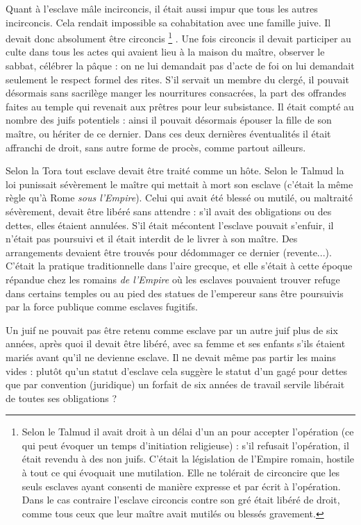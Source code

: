  Quant à l'esclave mâle incirconcis, il était aussi impur que tous les autres incirconcis. Cela rendait impossible sa cohabitation avec une famille juive. Il devait donc absolument être circoncis%
\footnote{Selon le Talmud il avait droit à un délai d'un an pour accepter l'opération (ce qui peut évoquer un temps d'initiation religieuse) : s'il refusait l'opération, il était revendu à des non juifs. C'était la législation de l'Empire romain, hostile à tout ce qui évoquait une mutilation. Elle ne tolérait de circoncire que les seuls esclaves ayant consenti de manière expresse et par écrit à l'opération. Dans le cas contraire l'esclave circoncis contre son gré était libéré de droit, comme tous ceux que leur maître avait mutilés ou blessés gravement.}%
. Une fois circoncis il devait participer au culte dans tous les actes qui avaient lieu à la maison du maître, observer le sabbat, célébrer la pâque : on ne lui demandait pas d'acte de foi on lui demandait seulement le respect formel des rites. S'il servait un membre du clergé, il pouvait désormais sans sacrilège manger les nourritures consacrées, la part des offrandes faites au temple qui revenait aux prêtres pour leur subsistance. Il était compté au nombre des juifs potentiels : ainsi il pouvait désormais épouser la fille de son maître, ou hériter de ce dernier. Dans ces deux dernières éventualités il était affranchi de droit, sans autre forme de procès, comme partout ailleurs.

 Selon la Tora tout esclave devait être traité comme un hôte. Selon le Talmud la loi punissait sévèrement le maître qui mettait à mort son esclave (c'était la même règle qu'à Rome \emph{sous l'Empire}). Celui qui avait été blessé ou mutilé, ou maltraité sévèrement, devait être libéré sans attendre : s'il avait des obligations ou des dettes, elles étaient annulées. S'il était mécontent l'esclave pouvait s'enfuir, il n'était pas poursuivi et il était interdit de le livrer à son maître. Des arrangements devaient être trouvés pour dédommager ce dernier (revente...). C'était la pratique traditionnelle dans l'aire grecque, et elle s'était à cette époque répandue chez les romains \emph{de l'Empire} où les esclaves pouvaient trouver refuge dans certains temples ou au pied des statues de l'empereur sans être poursuivis par la force publique comme esclaves fugitifs.

 Un juif ne pouvait pas être retenu comme esclave par un autre juif plus de six années, après quoi il devait être libéré, avec sa femme et ses enfants s'ils étaient mariés avant qu'il ne devienne esclave. Il ne devait même pas partir les mains vides : plutôt qu'un statut d'esclave cela suggère le statut d'un gagé pour dettes que par convention (juridique) un forfait de six années de travail servile libérait de toutes ses obligations ?


